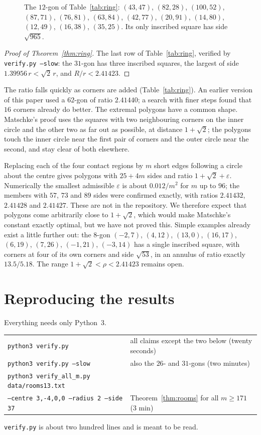 \documentclass[11pt,a4paper]{article}
\theoremstyle{remark}\newtheorem{remark}[theorem]{Remark}
\begin{document}
\begin{figure}[H]\centering
\caption{The $12$-gon of Table~\ref{tab:ring}:
$(43,47)$, $(82,28)$, $(100,52)$, $(87,71)$, $(76,81)$, $(63,84)$, $(42,77)$,
$(20,91)$, $(14,80)$, $(12,49)$, $(16,38)$, $(35,25)$. Its only inscribed square
has side $\sqrt{965}$.}
\end{figure}

\begin{proof}[Proof of Theorem~\ref{thm:ring}]
The last row of Table~\ref{tab:ring}, verified by \texttt{verify.py --slow}:
the $31$-gon has three inscribed squares, the largest of side
$1.39956\,r<\sqrt2\,r$, and $R/r<2.41423$.
\end{proof}

The ratio falls quickly as corners are added (Table~\ref{tab:ring}). An earlier
version of this paper used a $62$-gon of ratio $2.41440$; a search with finer
steps found that $16$ corners already do better. The extremal polygons have a
common shape. Matschke's proof uses the squares with two neighbouring corners on
the inner circle and the other two as far out as possible, at distance
$1+\sqrt2$; the polygons touch the inner circle near the first pair of corners
and the outer circle near the second, and stay clear of both elsewhere.

Replacing each of the four contact regions by $m$ short edges following a circle
about the centre gives polygons with $25+4m$ sides and ratio $1+\sqrt2+\varepsilon$.
Numerically the smallest admissible $\varepsilon$ is about $0.012/m^2$ for $m$ up
to $96$; the members with $57$, $73$ and $89$ sides were confirmed exactly, with
ratios $2.41432$, $2.41428$ and $2.41427$. These are not in the repository. We
therefore expect that polygons come arbitrarily close to $1+\sqrt2$, which
would make Matschke's constant exactly optimal, but we have not proved this.
Simple examples already exist a little further out: the $8$-gon
$(-2,7)$, $(4,12)$, $(13,0)$, $(16,17)$, $(6,19)$, $(7,26)$, $(-1,21)$, $(-3,14)$
has a single inscribed square, with corners at four of its own corners and side
$\sqrt{53}$, in an annulus of ratio exactly $13.5/5.18$. The range
$1+\sqrt2<\rho<2.41423$ remains open.

\section{Reproducing the results}

Everything needs only Python~3.
\begin{center}\small
\begin{tabular}{ll}
\texttt{python3 verify.py}&all claims except the two below (twenty seconds)\\
\texttt{python3 verify.py --slow}&also the $26$- and $31$-gons (two minutes)\\
\texttt{python3 verify\_all\_m.py data/rooms13.txt}&\\
\qquad\texttt{--centre 3,-4,0,0 --radius 2 --side 37}&Theorem~\ref{thm:rooms} for all $m\ge171$ (3 min)
\end{tabular}
\end{center}
\texttt{verify.py} is about two hundred lines and is meant to be read.
\end{document}
